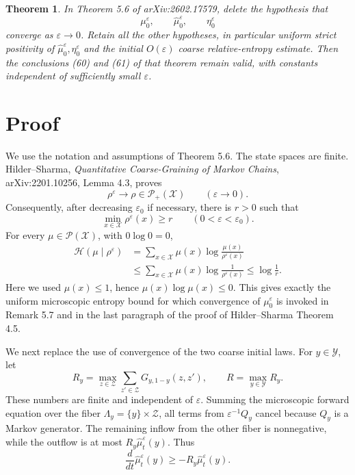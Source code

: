\documentclass[11pt]{article}
\newtheorem{theorem}{Theorem}
\newcommand{\Pp}{\mathcal P}
\newcommand{\Ent}{\mathcal H}
\newcommand{\X}{\mathcal X}
\newcommand{\Y}{\mathcal Y}
\newcommand{\Zs}{\mathcal Z}
\begin{document}
\begin{theorem}\label{thm:main}
In Theorem 5.6 of arXiv:2602.17579, delete the hypothesis that
\[
 \mu_0^\varepsilon,\qquad
 \widehat\mu_0^\varepsilon,\qquad
 \eta_0^\varepsilon
\]
converge as \(\varepsilon\to0\). Retain all the other hypotheses, in
particular uniform strict positivity of
\(\widehat\mu_0^\varepsilon,\eta_0^\varepsilon\) and the initial
\(O(\varepsilon)\) coarse relative-entropy estimate. Then the conclusions
(60) and (61) of that theorem remain valid, with constants independent of
sufficiently small \(\varepsilon\).
\end{theorem}

\section*{Proof}

We use the notation and assumptions of Theorem 5.6. The state spaces are
finite. Hilder--Sharma, \emph{Quantitative Coarse-Graining of Markov Chains},
arXiv:2201.10256, Lemma 4.3, proves
\[
 \rho^\varepsilon\longrightarrow\rho\in\Pp_+(\X)
 \qquad(\varepsilon\to0).
\]
Consequently, after decreasing \(\varepsilon_0\) if necessary, there is
\(r>0\) such that
\begin{equation}\label{eq:rho}
 \min_{x\in\X}\rho^\varepsilon(x)\geq r
 \qquad(0<\varepsilon<\varepsilon_0).
\end{equation}
For every \(\mu\in\Pp(\X)\), with \(0\log0=0\),
\begin{align}
 \Ent(\mu\mid\rho^\varepsilon)
 &=\sum_{x\in\X}\mu(x)\log\frac{\mu(x)}{\rho^\varepsilon(x)}
 \nonumber\\
 &\leq \sum_{x\in\X}\mu(x)\log\frac1{\rho^\varepsilon(x)}
 \leq \log\frac1r.                                      \label{eq:entropy}
\end{align}
Here we used \(\mu(x)\leq1\), hence \(\mu(x)\log\mu(x)\leq0\).
This gives exactly the uniform microscopic entropy bound for which
convergence of \(\mu_0^\varepsilon\) is invoked in Remark 5.7 and in the
last paragraph of the proof of Hilder--Sharma Theorem 4.5.

We next replace the use of convergence of the two coarse initial laws. For
\(y\in\Y\), let
\[
 R_y=\max_{z\in\Zs}\sum_{z'\in\Zs}G_{y,1-y}(z,z'),
 \qquad R=\max_{y\in\Y}R_y.
\]
These numbers are finite and independent of \(\varepsilon\). Summing the
microscopic forward equation over the fiber
\(\Lambda_y=\{y\}\times\Zs\), all terms from
\(\varepsilon^{-1}Q_y\) cancel because \(Q_y\) is a Markov generator.
The remaining inflow from the other fiber is nonnegative, while the outflow
is at most \(R_y\widehat\mu_t^\varepsilon(y)\). Thus
\begin{equation}\label{eq:coarse-diff}
 \frac{d}{dt}\widehat\mu_t^\varepsilon(y)
 \geq -R_y\widehat\mu_t^\varepsilon(y).
\end{equation}
\end{document}
